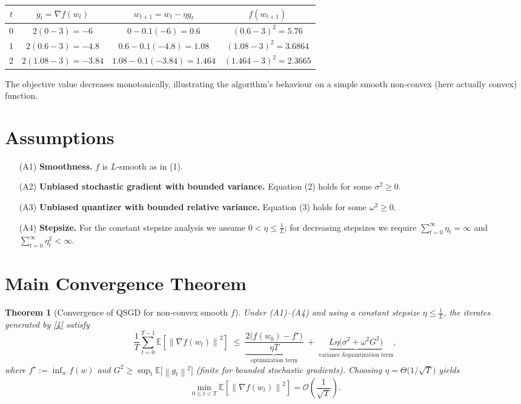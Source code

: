 \documentclass{article}
\newtheorem{theorem}{Theorem}
\newcommand{\E}{\mathbb{E}}
\newcommand{\norm}[1]{\left\lVert#1\right\rVert}
\begin{document}
\begin{center}
\begin{tabular}{c|c|c|c}
$t$ & $g_{t}= \nabla f(w_{t})$ & $w_{t+1}=w_{t}-\eta g_{t}$ & $f(w_{t+1})$\\ \hline
0 & $2(0-3)=-6$ & $0-0.1(-6)=0.6$ & $(0.6-3)^{2}=5.76$\\
1 & $2(0.6-3)=-4.8$ & $0.6-0.1(-4.8)=1.08$ & $(1.08-3)^{2}=3.6864$\\
2 & $2(1.08-3)=-3.84$ & $1.08-0.1(-3.84)=1.464$ & $(1.464-3)^{2}=2.3665$\\
\end{tabular}
\end{center}
The objective value decreases monotonically, illustrating the algorithm’s behaviour on a simple smooth non‑convex (here actually convex) function.

\newpage
\section*{Assumptions}
\begin{enumerate}
\item[(A1)] \textbf{Smoothness.} $f$ is $L$‑smooth as in (1).
\item[(A2)] \textbf{Unbiased stochastic gradient with bounded variance.}  Equation (2) holds for some $\sigma^{2}\ge0$.
\item[(A3)] \textbf{Unbiased quantizer with bounded relative variance.}  Equation (3) holds for some $\omega^{2}\ge0$.
\item[(A4)] \textbf{Stepsize.} For the constant stepsize analysis we assume $0<\eta\le\frac{1}{L}$; for decreasing stepsizes we require $\sum_{t=0}^{\infty}\eta_{t}= \infty$ and $\sum_{t=0}^{\infty}\eta_{t}^{2}<\infty$.
\end{enumerate}

\section*{Main Convergence Theorem}
\begin{theorem}[Convergence of QSGD for non‑convex smooth $f$]\label{thm:main}
Under (A1)–(A4) and using a constant stepsize $\eta\le\frac{1}{L}$, the iterates generated by \eqref{4} satisfy
\[
\frac{1}{T}\sum_{t=0}^{T-1}\E\!\left[\norm{\nabla f(w_{t})}^{2}\right]
\;\le\;
\underbrace{\frac{2\bigl(f(w_{0})-f^{\star}\bigr)}{\eta T}}_{\text{optimization term}}
\;+\;
\underbrace{L\eta\bigl(\sigma^{2}+\omega^{2}G^{2}\bigr)}_{\text{variance \& quantization term}},
\tag{5}
\]
where $f^{\star}:=\inf_{w}f(w)$ and $G^{2}\ge \sup_{t}\E\!\bigl[\norm{g_{t}}^{2}\bigr]$ (finite for bounded stochastic gradients).  
Choosing $\eta = \Theta\!\bigl(1/\sqrt{T}\bigr)$ yields
\[
\min_{0\le t<T}\E\!\left[\norm{\nabla f(w_{t})}^{2}\right]=\mathcal{O}\!\left(\frac{1}{\sqrt{T}}\right).
\]
\end{theorem}
\end{document}
